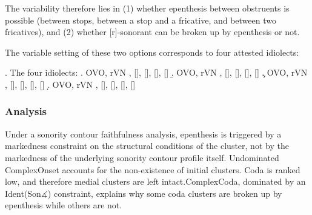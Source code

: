 \documentclass[12pt]{article}
\newcommand{\tickYes}{\checkmark}
\newcommand{\tickNo}{\hspace{1pt}\ding{55}}
\begin{document}
\bigskip

The variability therefore lies in (1) whether epenthesis between obstruents is possible (between stops, between a stop and a fricative, and between two fricatives), and (2) whether [r]-sonorant can be broken up by epenthesis or not.

The variable setting of these two options corresponds to four attested idiolects:

  \ex. \label{idiolects} The four idiolects: \citep[(43)]{rose.2000}
       \a. \label{idiolecta} \tickYes OVO, \tickNo rVN \newline %
           [\textipa{k1rm}], [], [], [], []
       \b. \label{idiolectb} \tickYes OVO, \tickYes rVN \newline %
           [\textipa{k1r1m}], [], [], [], []
       \c. \label{idiolectc} \tickNo OVO, \tickNo rVN \newline %
           [\textipa{k1rm}], [], [], [], []
       \d. \label{idiolectd} \tickNo OVO, \tickYes rVN \newline %
           [\textipa{k1r1m}], [], [], [], []


\subsubsection{Analysis}

Under a sonority contour faithfulness analysis, epenthesis is triggered by a markedness constraint on the structural conditions of the cluster, not by the markedness of the underlying sonority contour profile itself. Undominated {\sc *ComplexOnset} accounts for the non-existence of initial clusters. {\sc *Coda} is ranked low, and therefore medial clusters are left intact.{\sc *ComplexCoda}, dominated by an {\sc Ident(Son$\measuredangle$)} constraint, explains why some coda clusters are broken up by epenthesis while others are not.
\end{document}
